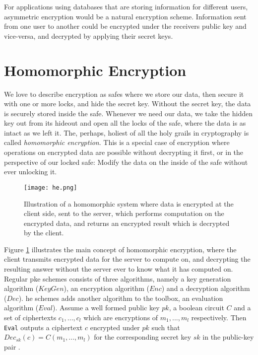 For applications using databases that are storing information for different users, asymmetric encryption would be a natural encryption scheme. Information sent from one user to another could be encrypted under the receivers public key and vice-versa, and decrypted by applying their secret keys.

\section{Homomorphic Encryption}

We love to describe encryption as safes where we store our data, then secure it with one or more locks, and hide the secret key. Without the secret key, the data is securely stored inside the safe. Whenever we need our data, we take the hidden key out from its hideout and open all the locks of the safe, where the data is as intact as we left it. The, perhaps, holiest of all the holy grails in cryptography is called \emph{homomorphic encryption}. This is a special case of encryption where operations on encrypted data are possible without decrypting it first, or in the perspective of our locked safe: Modify the data on the inside of the safe without ever unlocking it.

\begin{figure}[h]
	\centering
	\texttt{[image: he.png]}
	\caption{Illustration of a homomorphic system where data is encrypted at the client side, sent to the server, which performs computation on the encrypted data, and returns an encrypted result which is decrypted by the client.}
	\label{fig:he_ill}
\end{figure}

Figure \ref{fig:he_ill} illustrates the main concept of homomorphic encryption, where the client transmits encrypted data for the server to compute on, and decrypting the resulting answer without the server ever to know what it has computed on. Regular \gls{pke} schemes consists of three algorithms, namely a key generation algorithm ($KeyGen$), an encryption algorithm ($Enc$) and a decryption algorithm ($Dec$). \gls{he} schemes adds another algorithm to the toolbox, an evaluation algorithm ($Eval$).  Assume a well formed public key $pk$, a boolean circuit $C$ and a set of ciphertexts $c_1, ..., c_l$ which are encryptions of $m_1, ..., m_l$ respectively. Then \texttt{Eval} outputs a ciphertext $c$ encrypted under $pk$ such that $Dec_{sk}(c) = C(m_1, ..., m_l)$ for the corresponding secret key $sk$ in the public-key pair \cite{damgaard2012secure}.


